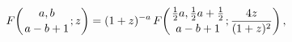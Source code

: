 \[\mathop{F\/}\nolimits\!\left({a,b\atop a-b+1};z\right)=(1+z)^{-a}\mathop{F\/}%
\nolimits\!\left({\frac{1}{2}a,\frac{1}{2}a+\frac{1}{2}\atop a-b+1};\frac{4z}{%
(1+z)^{2}}\right),\]